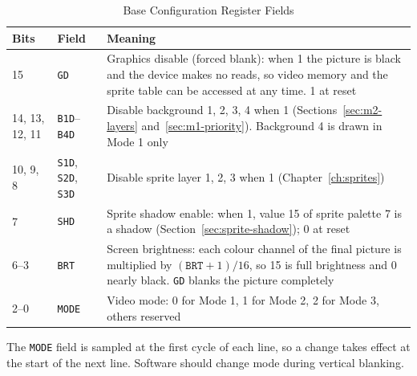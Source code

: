 \begin{table}[H]
	\centering
	\begin{tabular}{llp{7.5cm}}
		\toprule
		\textbf{Bits}  & \textbf{Field}                           & \textbf{Meaning}                                                                                                                                                                             \\
		\midrule
		15             & \texttt{GD}                              & Graphics disable (forced blank): when 1 the picture is black and the device makes no reads, so video memory and the sprite table can be accessed at any time. 1 at reset                     \\
		14, 13, 12, 11 & \texttt{B1D}--\texttt{B4D}               & Disable background 1, 2, 3, 4 when 1 (Sections~\ref{sec:m2-layers} and~\ref{sec:m1-priority}). Background 4 is drawn in Mode 1 only                                                          \\
		10, 9, 8       & \texttt{S1D}, \texttt{S2D}, \texttt{S3D} & Disable sprite layer 1, 2, 3 when 1 (Chapter~\ref{ch:sprites})                                                                                                                               \\
		7              & \texttt{SHD}                             & Sprite shadow enable: when 1, value 15 of sprite palette 7 is a shadow (Section~\ref{sec:sprite-shadow}); 0 at reset                                                                         \\
		6--3           & \texttt{BRT}                             & Screen brightness: each colour channel of the final picture is multiplied by $(\texttt{BRT} + 1)/16$, so 15 is full brightness and 0 nearly black. \texttt{GD} blanks the picture completely \\
		2--0           & \texttt{MODE}                            & Video mode: 0 for Mode 1, 1 for Mode 2, 2 for Mode 3, others reserved                                                                                                                        \\
		\bottomrule
	\end{tabular}
	\caption{Base Configuration Register Fields}
	\label{tab:reg-config-fields}
\end{table}

The \texttt{MODE} field is sampled at the first cycle of each line, so a change takes effect at the start of the next
line. Software should change mode during vertical blanking.

